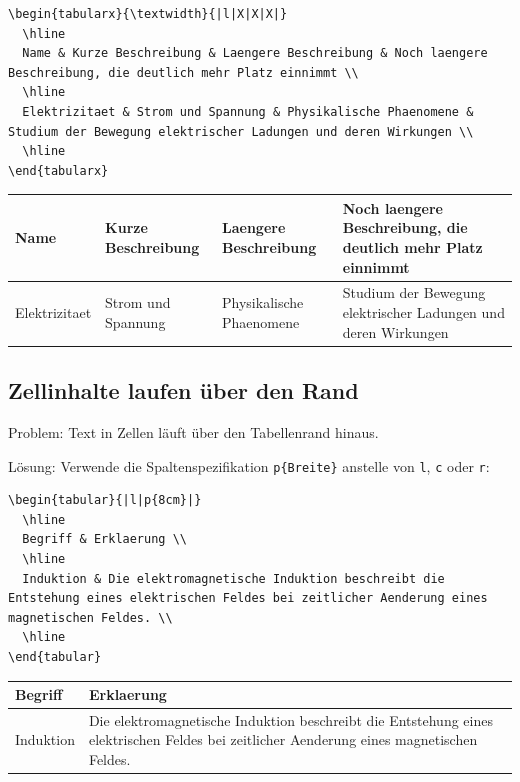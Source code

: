\documentclass[12pt,a4paper]{article}
\begin{document}
\begin{lstlisting}[style=latex]
\begin{tabularx}{\textwidth}{|l|X|X|X|}
  \hline
  Name & Kurze Beschreibung & Laengere Beschreibung & Noch laengere Beschreibung, die deutlich mehr Platz einnimmt \\
  \hline
  Elektrizitaet & Strom und Spannung & Physikalische Phaenomene & Studium der Bewegung elektrischer Ladungen und deren Wirkungen \\
  \hline
\end{tabularx}
\end{lstlisting}
\begin{ausgabe}
\begin{tabularx}{\textwidth}{|l|X|X|X|}
  \hline
  Name & Kurze Beschreibung & Laengere Beschreibung & Noch laengere Beschreibung, die deutlich mehr Platz einnimmt \\
  \hline
  Elektrizitaet & Strom und Spannung & Physikalische Phaenomene & Studium der Bewegung elektrischer Ladungen und deren Wirkungen \\
  \hline
\end{tabularx}
\end{ausgabe}

\subsection{Zellinhalte laufen über den Rand}

Problem: Text in Zellen läuft über den Tabellenrand hinaus.

Lösung: Verwende die Spaltenspezifikation \texttt{p\{Breite\}} anstelle von \texttt{l}, \texttt{c} oder \texttt{r}:

\begin{lstlisting}[style=latex]
\begin{tabular}{|l|p{8cm}|}
  \hline
  Begriff & Erklaerung \\
  \hline
  Induktion & Die elektromagnetische Induktion beschreibt die Entstehung eines elektrischen Feldes bei zeitlicher Aenderung eines magnetischen Feldes. \\
  \hline
\end{tabular}
\end{lstlisting}

\begin{ausgabe}
\begin{tabular}{|l|p{8cm}|}
  \hline
  Begriff & Erklaerung \\
  \hline
  Induktion & Die elektromagnetische Induktion beschreibt die Entstehung eines elektrischen Feldes bei zeitlicher Aenderung eines magnetischen Feldes. \\
  \hline
\end{tabular}
\end{ausgabe}
\end{document}
